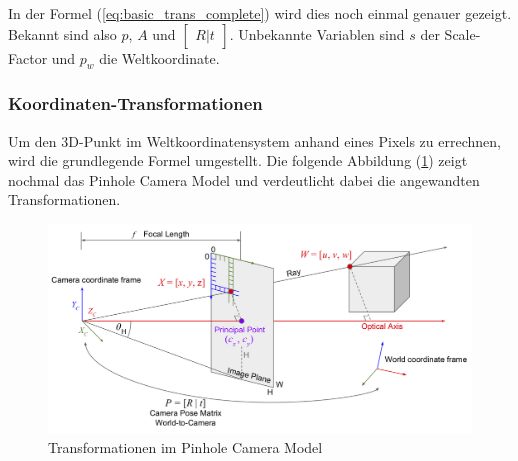 	In der Formel (\ref{eq:basic_trans_complete}) wird dies noch einmal genauer gezeigt. Bekannt sind also \( p \), \( A \) und \( \begin{bmatrix} R|t \end{bmatrix} \). Unbekannte Variablen sind \( s \) der Scale-Factor und \( p_w \) die Weltkoordinate.
	
	\subsubsection{Koordinaten-Transformationen}
	Um den 3D-Punkt im Weltkoordinatensystem anhand eines Pixels zu errechnen, wird die grundlegende Formel umgestellt. Die folgende Abbildung (\ref{fig:pinhole-camera-model_transformations}) zeigt nochmal das Pinhole Camera Model und verdeutlicht dabei die angewandten Transformationen.
	
	\begin{figure}[h]
		\centering
		\includegraphics[width=0.9\linewidth]{img/grundlagen/pinhole_camera_model_2.png}
		\caption[Transformationen]{Transformationen im Pinhole Camera Model}
		\label{fig:pinhole-camera-model_transformations}
	\end{figure}
	
